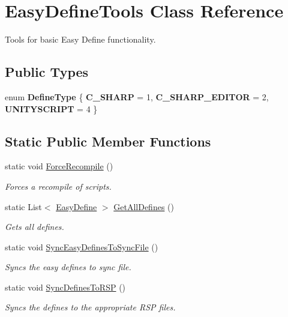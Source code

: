 \hypertarget{class_easy_define_tools}{}\section{Easy\+Define\+Tools Class Reference}
\label{class_easy_define_tools}


Tools for basic Easy Define functionality.  


\subsection*{Public Types}
\begin{DoxyCompactItemize}
\item 
\hypertarget{class_easy_define_tools_a2e974776840fb71bf36a91696e28b3ec}{}enum {\bfseries Define\+Type} \{ {\bfseries C\+\_\+\+S\+H\+A\+R\+P} = 1, 
{\bfseries C\+\_\+\+S\+H\+A\+R\+P\+\_\+\+E\+D\+I\+T\+O\+R} = 2, 
{\bfseries U\+N\+I\+T\+Y\+S\+C\+R\+I\+P\+T} = 4
 \}\label{class_easy_define_tools_a2e974776840fb71bf36a91696e28b3ec}

\end{DoxyCompactItemize}
\subsection*{Static Public Member Functions}
\begin{DoxyCompactItemize}
\item 
static void \hyperlink{class_easy_define_tools_a7f1ece2d15f626ab536832217bc31c07}{Force\+Recompile} ()
\begin{DoxyCompactList}\small\item\em Forces a recompile of scripts. \end{DoxyCompactList}\item 
static List$<$ \hyperlink{struct_easy_define}{Easy\+Define} $>$ \hyperlink{class_easy_define_tools_a7e60d8153201ed5e2aeab1f462927590}{Get\+All\+Defines} ()
\begin{DoxyCompactList}\small\item\em Gets all defines. \end{DoxyCompactList}\item 
static void \hyperlink{class_easy_define_tools_ad1d68b0ebdf0a0a0cfcb8ef6d0fba90f}{Sync\+Easy\+Defines\+To\+Sync\+File} ()
\begin{DoxyCompactList}\small\item\em Syncs the easy defines to sync file. \end{DoxyCompactList}\item 
static void \hyperlink{class_easy_define_tools_a7e4a5e6a6890cd324a51dfbc1bd33b3f}{Sync\+Defines\+To\+R\+S\+P} ()
\begin{DoxyCompactList}\small\item\em Syncs the defines to the appropriate R\+S\+P files. \end{DoxyCompactList}\end{DoxyCompactItemize}
